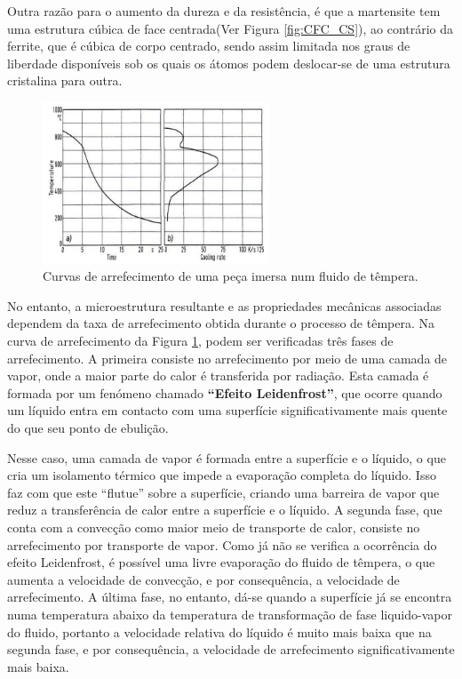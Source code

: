 \par
Outra razão para o aumento da dureza e da resistência, é que a martensite tem uma estrutura cúbica de face centrada(Ver Figura \ref{fig:CFC_CS}), ao contrário da ferrite, que é cúbica de corpo centrado, sendo assim limitada nos graus de liberdade disponíveis sob os quais os átomos podem deslocar-se de uma estrutura cristalina para outra.
\begin{figure}[htb]
    \centering
    \includegraphics[width = 0.6\textwidth]{Figures/Cap2/Tempera_Arrefecimento.png}
    \caption[Curva de arrefecimento em fluido de têmpera]%
    {Curvas de arrefecimento de uma peça imersa num fluido de têmpera.}
    \label{fig:tempera_arref}
\end{figure}
\par
No entanto, a microestrutura resultante e as propriedades mecânicas associadas dependem da taxa de arrefecimento obtida durante o processo de têmpera. Na curva de arrefecimento da Figura \ref{fig:tempera_arref}, podem ser verificadas três fases de arrefecimento. A primeira consiste no arrefecimento por meio de uma camada de vapor, onde a maior parte do calor é transferida por radiação. Esta camada é formada por um fenómeno chamado \textbf{“Efeito Leidenfrost”}, que ocorre quando um líquido entra em contacto com uma superfície significativamente mais quente do que seu ponto de ebulição. 
\newpage
\par
Nesse caso, uma camada de vapor é formada entre a superfície e o líquido, o que cria um isolamento térmico que impede a evaporação completa do líquido. Isso faz com que este “flutue” sobre a superfície, criando uma barreira de vapor que reduz a transferência de calor entre a superfície e o líquido. A segunda fase, que conta com a convecção como maior meio de transporte de calor, consiste no arrefecimento por transporte de vapor. Como já não se verifica a ocorrência do efeito Leidenfrost, é possível uma livre evaporação do fluido de têmpera, o que aumenta a velocidade de convecção, e por consequência, a velocidade de arrefecimento. A última fase, no entanto, dá-se quando a superfície já se encontra numa temperatura abaixo da temperatura de transformação de fase liquido-vapor do fluido, portanto a velocidade relativa do líquido é muito mais baixa que na segunda fase, e por consequência, a velocidade de arrefecimento significativamente mais baixa.

